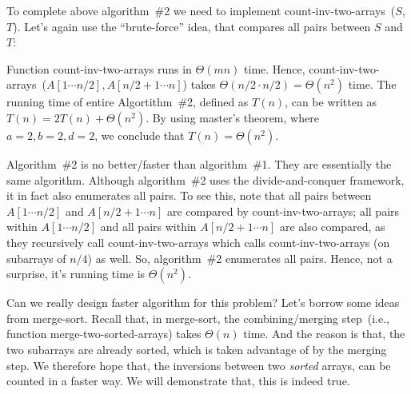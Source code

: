 \begin{algorithmblock}[0.8\textwidth]
	\xxx
	\xxx
	\xxx
	\xxx
	\xxx
	\xxx
\end{algorithmblock}

To complete above algorithm~\#2 we need to implement count-inv-two-arrays~($S$, $T$). 
Let's again use the ``brute-force'' idea, that compares all pairs between $S$ and $T$:

\begin{algorithmblock}[0.8\textwidth]
	\xxx
	\xxx
	\xxx
	\xxx
	\xxx
	\xxx
\end{algorithmblock}

Function count-inv-two-arrays runs in $\Theta(mn)$ time.
Hence, count-inv-two-arrays~($A[1\cdots n/2], A[n/2 + 1\cdots n]$) takes $\Theta(n/2\cdot n/2) = \Theta(n^2)$ time.
The running time of entire Algortithm~\#2, defined as $T(n)$,  can be written as $T(n) = 2T(n) + \Theta(n^2)$.
By using master's theorem, where $a = 2, b=2, d=2$, we conclude that $T(n) = \Theta(n^2)$.

Algorithm~\#2 is no better/faster than algorithm~\#1.
They are essentially the same algorithm. Although algorithm~\#2 uses the divide-and-conquer framework, it in fact
also enumerates all pairs. To see this, note that all pairs between $A[1\cdots n/2]$ and $A[n/2 + 1\cdots n]$ are compared
by count-inv-two-arrays; all pairs within $A[1\cdots n/2]$ and all pairs within $A[n/2 + 1\cdots n]$ are also compared,
as they recursively call count-inv-two-arrays which calls count-inv-two-arrays (on subarrays of $n/4$) as well. 
So, algorithm~\#2 enumerates all pairs. Hence, not a surprise, it's running time is $\Theta(n^2)$.

Can we really design faster algorithm for this problem?
Let's borrow some ideas from merge-sort. Recall that, in merge-sort, the combining/merging step~(i.e., function merge-two-sorted-arrays)
takes $\Theta(n)$ time. And the reason is that, the two subarrays are already sorted, which is taken advantage of by the merging step.
We therefore hope that, the inversions between two \emph{sorted} arrays, can be counted in a faster way. We will demonstrate that, this is
indeed true.

